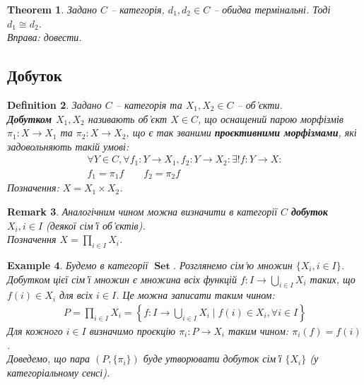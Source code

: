 \documentclass[a4paper, 10pt]{article}
\theoremstyle{theoremdd}
\newtheorem{theorem}{Theorem}[subsection]
\newtheorem{definition}[theorem]{Definition}
\newtheorem{example}[theorem]{Example}
\newtheorem{remark}[theorem]{Remark}
\DeclareMathOperator{\Set}{\textbf{Set}}
\begin{document}
\begin{theorem}
Задано $C$ -- категорія, $d_1,d_2 \in C$ -- обидва термінальні. Тоді $d_1 \cong d_2$.\\
\textit{Вправа: довести.}
\end{theorem}

\subsection{Добуток}
\begin{definition}
Задано $C$ -- категорія та $X_1,X_2 \in C$ -- об'єкти.\\
\textbf{Добутком $X_1,X_2$} називають об'єкт $X \in C$, що оснащений парою морфізмів $\pi_1 \colon X \to X_1$ та $\pi_2 \colon X \to X_2$, що є так званими \textbf{проєктивними морфізмами}, які задовольняють такій умові:
\begin{align*}
\forall Y \in C, \forall f_1 \colon Y \to X_1, f_2 \colon Y \to X_2: \exists ! f \colon Y \to X: \\
f_1 = \pi_1 f \qquad f_2 = \pi_2 f
\end{align*}
Позначення: $X = X_1 \times X_2$.
\begin{figure}[H]
\centering
{}
\end{figure}
\end{definition}

\begin{remark}
Аналогічним чином можна визначити в категорії $C$ \textbf{добуток $X_i, i \in I$} (деякої сім'ї об'єктів).\\
Позначення $X = \displaystyle\prod_{i \in I} X_i$.
\end{remark}

\begin{example}
Будемо в категорії $\Set$. Розглянемо сім'ю множин $\{X_i,i \in I\}$. Добутком цієї сім'ї множин є множина всіх функцій $f \colon I \to \displaystyle\bigcup_{i \in I} X_i$ таких, що $f(i) \in X_i$ для всіх $i \in I$. Це можна записати таким чином:
\begin{align*}
P = \prod_{i \in I} X_i = \left\{ f \colon I \to \bigcup_{i \in I} X_i \mid f(i) \in X_i, \forall i \in I \right\}
\end{align*}
Для кожного $i \in I$ визначимо проєкцію $\pi_i \colon P \to X_i$ таким чином: $\pi_i(f) = f(i)$.\\
Доведемо, що пара $(P,\{\pi_i\})$ буде утворювати добуток сім'ї $\{X_i\}$ (у категоріальному сенсі).
\end{example}
\end{document}
